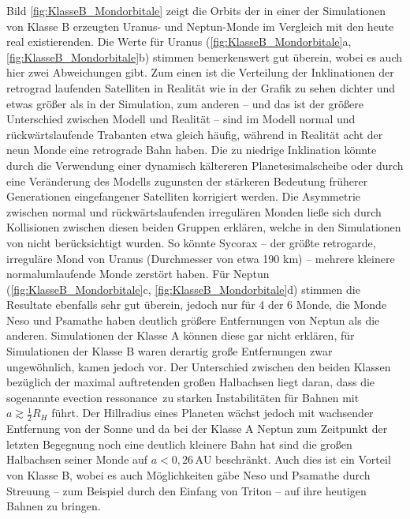 \documentclass[12pt,a4paper,twoside]{article}
\newcommand{\AU}{\,\mathrm{AU}}
\begin{document}
Bild \ref{fig:KlasseB_Mondorbitale} zeigt die Orbits der in einer der Simulationen von Klasse B erzeugten Uranus- und Neptun-Monde im Vergleich mit den heute real existierenden. %
Die Werte für Uranus (\ref{fig:KlasseB_Mondorbitale}a, \ref{fig:KlasseB_Mondorbitale}b) stimmen bemerkenswert gut überein, wobei es auch hier zwei %
Abweichungen gibt. Zum einen ist die Verteilung der Inklinationen der retrograd laufenden Satelliten in Realität wie in der Grafik zu sehen dichter und etwas größer als in der Simulation, 
zum anderen – und das ist der größere Unterschied zwischen Modell und Realität – sind im Modell normal und rückwärtslaufende Trabanten etwa gleich häufig, während in Realität acht der neun Monde eine retrograde Bahn haben\cite{Nesvorny2007}.
Die zu niedrige Inklination könnte durch die Verwendung einer dynamisch kältereren Planetesimalscheibe oder durch eine Veränderung des Modells zugunsten der stärkeren Bedeutung früherer Generationen eingefangener Satelliten korrigiert werden\cite{Nesvorny2007}. %
Die Asymmetrie zwischen normal und rückwärtslaufenden irregulären Monden ließe sich durch Kollisionen zwischen diesen beiden Gruppen erklären, welche in den Simulationen von \cite{Nesvorny2007} nicht berücksichtigt wurden. So könnte Sycorax – der größte retrogarde, irreguläre Mond von Uranus (Durchmesser von etwa 190 km) – mehrere kleinere normalumlaufende Monde zerstört haben\cite{Nesvorny2007}. %
Für Neptun (\ref{fig:KlasseB_Mondorbitale}c, \ref{fig:KlasseB_Mondorbitale}d) stimmen die Resultate ebenfalls sehr gut überein, jedoch nur für 4 der 6 Monde, die Monde Neso und Psamathe haben deutlich größere Entfernungen von Neptun als die anderen\cite{Nesvorny2007}.
Simulationen der Klasse A können diese gar nicht erklären, für Simulationen der Klasse B waren derartig große Entfernungen zwar ungewöhnlich, kamen jedoch vor.
Der Unterschied zwischen den beiden Klassen bezüglich der maximal auftretenden großen Halbachsen liegt daran, dass die sogenannte \glqq evection ressonance\grqq\ zu starken Instabilitäten für Bahnen mit $a \gtrsim \frac{1}{2} R_H$ führt\cite{Nesvorny2007}. %
Der Hillradius eines Planeten wächst jedoch mit wachsender Entfernung von der Sonne und da bei der Klasse A Neptun zum Zeitpunkt der letzten Begegnung noch eine deutlich kleinere Bahn hat sind die großen Halbachsen seiner Monde auf $a < 0,26 \AU$ beschränkt\cite{Nesvorny2007}.
Auch dies ist ein Vorteil von Klasse B, wobei es auch Möglichkeiten gäbe Neso und Psamathe durch Streuung – zum Beispiel durch den Einfang von Triton – auf ihre heutigen Bahnen zu bringen. %
\end{document}
